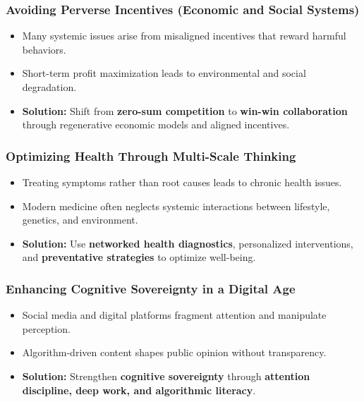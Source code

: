 \begin{frame}[fragile]\frametitle{Avoiding Perverse Incentives (Economic and Social Systems)}
	\begin{itemize}
	\item Many systemic issues arise from misaligned incentives that reward harmful behaviors.
	\item Short-term profit maximization leads to environmental and social degradation.
	\item \textbf{Solution:} Shift from \textbf{zero-sum competition} to \textbf{win-win collaboration} through regenerative economic models and aligned incentives.
	\end{itemize}
\end{frame}

\begin{frame}[fragile]\frametitle{Optimizing Health Through Multi-Scale Thinking}
	\begin{itemize}
	\item Treating symptoms rather than root causes leads to chronic health issues.
	\item Modern medicine often neglects systemic interactions between lifestyle, genetics, and environment.
	\item \textbf{Solution:} Use \textbf{networked health diagnostics}, personalized interventions, and \textbf{preventative strategies} to optimize well-being.
	\end{itemize}
\end{frame}

\begin{frame}[fragile]\frametitle{Enhancing Cognitive Sovereignty in a Digital Age}
	\begin{itemize}
	\item Social media and digital platforms fragment attention and manipulate perception.
	\item Algorithm-driven content shapes public opinion without transparency.
	\item \textbf{Solution:} Strengthen \textbf{cognitive sovereignty} through \textbf{attention discipline, deep work, and algorithmic literacy}.
	\end{itemize}
\end{frame}

